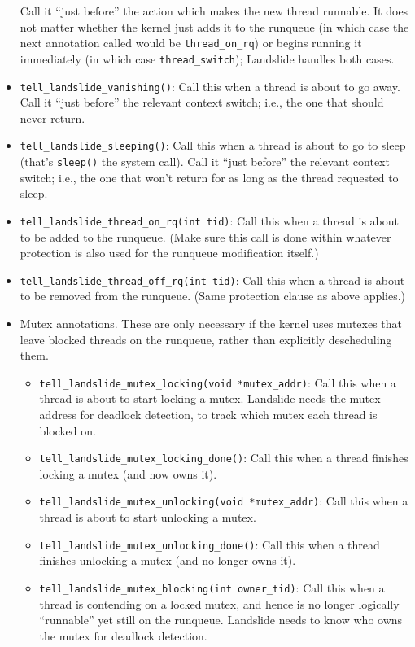 \begin{itemize}
		Call it ``just before'' the action which makes the new thread runnable. It does not matter whether the kernel just adds it to the runqueue (in which case the next annotation called would be \texttt{thread\_on\_rq}) or begins running it immediately (in which case \texttt{thread\_switch}); Landslide handles both cases.
	\item \texttt{tell\_landslide\_vanishing()}: Call this when a thread is about to go away.
		Call it ``just before'' the relevant context switch; i.e., the one that should never return.
	\item \texttt{tell\_landslide\_sleeping()}: Call this when a thread is about to go to sleep (that's \texttt{sleep()} the system call).
		Call it ``just before'' the relevant context switch; i.e., the one that won't return for as long as the thread requested to sleep.
	\item \texttt{tell\_landslide\_thread\_on\_rq(int tid)}: Call this when a thread is about to be added to the runqueue.
		(Make sure this call is done within whatever protection is also used for the runqueue modification itself.)
	\item \texttt{tell\_landslide\_thread\_off\_rq(int tid)}: Call this when a thread is about to be removed from the runqueue. (Same protection clause as above applies.)
	\item Mutex annotations. These are only necessary if the kernel uses mutexes that leave blocked threads on the runqueue, rather than explicitly descheduling them.
	\begin{itemize}
		\item \texttt{tell\_landslide\_mutex\_locking(void *mutex\_addr)}: Call this when a thread is about to start locking a mutex. Landslide needs the mutex address for deadlock detection, to track which mutex each thread is blocked on.
		\item \texttt{tell\_landslide\_mutex\_locking\_done()}: Call this when a thread finishes locking a mutex (and now owns it).
		\item \texttt{tell\_landslide\_mutex\_unlocking(void *mutex\_addr)}: Call this when a thread is about to start unlocking a mutex.
		\item \texttt{tell\_landslide\_mutex\_unlocking\_done()}: Call this when a thread finishes unlocking a mutex (and no longer owns it).
		\item \texttt{tell\_landslide\_mutex\_blocking(int owner\_tid)}: Call this when a thread is contending on a locked mutex, and hence is no longer logically ``runnable'' yet still on the runqueue. Landslide needs to know who owns the mutex for deadlock detection.
	\end{itemize}
\end{itemize}

